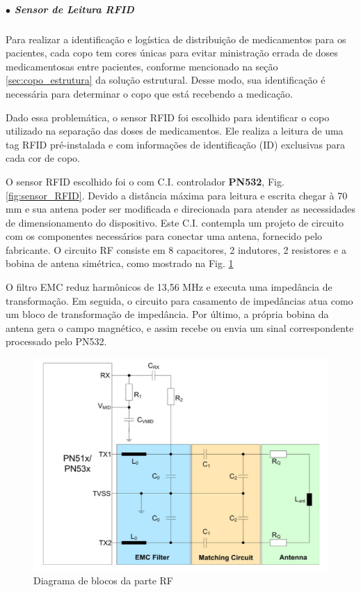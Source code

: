     \subparagraph*{$\bullet$ Sensor de Leitura RFID} \hfill
    
    Para realizar a identificação e logística de distribuição de medicamentos para os pacientes, cada copo tem cores únicas para evitar ministração errada de doses medicamentosas entre pacientes, conforme mencionado na seção \ref{sec:copo_estrutura} da solução estrutural. Desse modo, sua identificação é necessária para determinar o copo que está recebendo a medicação. 
    
    Dado essa problemática, o sensor RFID foi escolhido para identificar o copo utilizado na separação das doses de medicamentos. Ele realiza a leitura de uma tag RFID pré-instalada e com informações de identificação (ID) exclusivas para cada cor de copo.
    
    O sensor RFID escolhido foi o com C.I. controlador \textbf{PN532}, Fig. \ref{fig:sensor_RFID}. Devido a distância máxima para leitura e escrita chegar à 70 mm e sua antena poder ser modificada e direcionada para atender as necessidades de dimensionamento do dispositivo. Este C.I. contempla um projeto de circuito com os componentes necessários para conectar uma antena, fornecido pelo fabricante. O circuito RF consiste em 8 capacitores, 2 indutores, 2 resistores e a bobina de antena simétrica, como mostrado na Fig. \ref{fig:antena_RFID}
    
    O filtro EMC reduz harmônicos de 13,56 MHz e executa uma impedância de transformação. Em seguida, o circuito para casamento de impedâncias atua como um bloco de transformação de impedância. Por último, a própria bobina da antena gera o campo magnético, e assim recebe ou envia um sinal correspondente processado pelo PN532.
    
    \begin{figure}[H]
    \centering
    \includegraphics[scale=0.65]{figuras/eletronica/esquematicos/antena_RFID.png}
    \caption{Diagrama de blocos da parte RF}
    \label{fig:antena_RFID}
    \end{figure}

